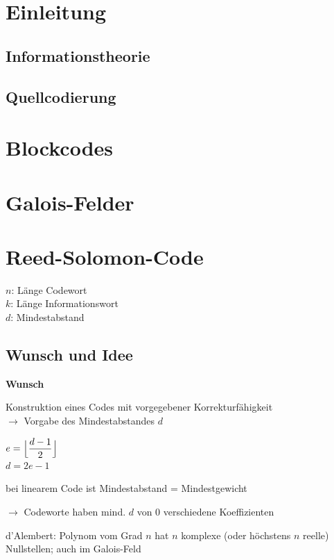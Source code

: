 \section{Einleitung}

\subsection{Informationstheorie}

\subsection{Quellcodierung}

\section{Blockcodes}

\section{Galois-Felder}
\label{sec:galois}


\section{Reed-Solomon-Code}

$n$: Länge Codewort\\
$k$: Länge Informationswort\\
$d$: Mindestabstand

\subsection{Wunsch und Idee}

\textbf{Wunsch}

Konstruktion eines Codes mit vorgegebener Korrekturfähigkeit\\
$\rightarrow$ Vorgabe des Mindestabstandes $d$

$\displaystyle{
    e = \Bigl\lfloor \frac{d - 1}{2} \Bigr\rfloor
}$\\
$\displaystyle{
    d = 2e - 1
}$

bei linearem Code ist Mindestabstand = Mindestgewicht

$\rightarrow$ Codeworte haben mind. $d$ von 0 verschiedene Koeffizienten

d'Alembert: Polynom vom Grad $n$ hat $n$ komplexe (oder höchstens $n$ reelle) Nullstellen; auch
im Galois-Feld

